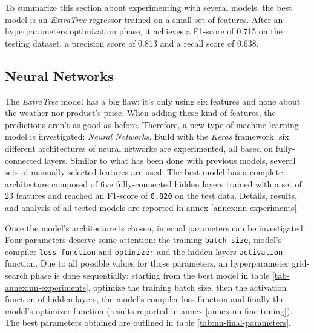 To summarize this section about experimenting with several models, the best model is an \textit{ExtraTree} regressor trained on a small set of features. After an hyperparameters optimization phase, it achieves a F1-score of 0.715 on the testing dataset, a precision score of 0.813 and a recall score of 0.638.


\subsection{Neural Networks}
The \textit{ExtraTree} model has a big flaw: it's only using six features and none about the weather nor product's price. When adding these kind of features, the predictions aren't as good as before. Therefore, a new type of machine learning model is investigated: \textit{Neural Networks}. Build with the \textit{Keras} framework, six different architectures of neural networks are experimented, all based on fully-connected layers. Similar to what has been done with previous models, several sets of manually selected features are used. The best model has a complete architecture composed of five fully-connected hidden layers trained with a set of 23 features and reached an F1-score of \texttt{0.820} on the test data. Details, results, and analysis of all tested models are reported in annex \ref{annex:nn-experiments}.

Once the model's architecture is chosen, internal parameters can be investigated. Four parameters deserve some attention: the training \texttt{batch size}, model's compiler \texttt{loss function} and \texttt{optimizer} and the hidden layers \texttt{activation} function. Due to all possible values for those parameters, an hyperparameter grid-search phase is done sequentially: starting from the best model in table \ref{tab-annex:nn-experiments}, optimize the training batch size, then the activation function of hidden layers, the model's compiler loss function and finally the model's optimizer function (results reported in annex \ref{annex:nn-fine-tuning}). The best parameters obtained are outlined in table \ref{tab:nn-final-parameters}.

